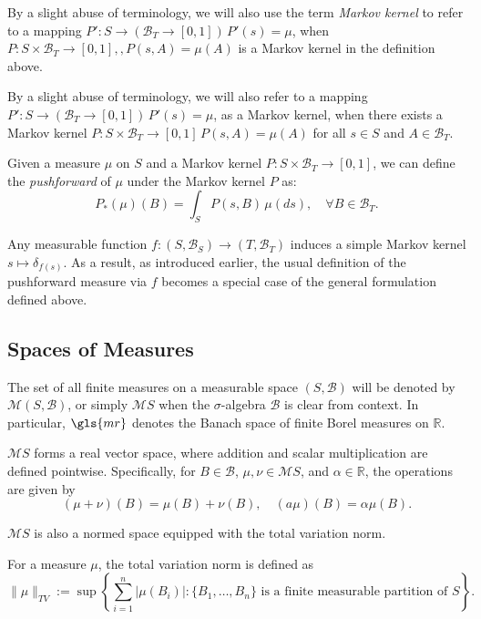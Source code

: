 By a slight abuse of terminology, we will also use the term \emph{Markov kernel} to refer to a mapping  $P': S \to (\mathcal{B}_T \to [0,1]) \, P'(s)=\mu$, when $P : S \times \mathcal{B}_T \to [0,1], , P(s,A)=\mu(A)$ is a Markov kernel in the definition above.

By a slight abuse of terminology, we will also refer to a mapping $ P' : S \to (\mathcal{B}_T \to [0,1])\, P'(s)=\mu $, as a Markov kernel, when there exists a Markov kernel $ P : S \times \mathcal{B}_T \to [0,1] \, P(s,A)=\mu (A) $  for all $s \in S $ and $A \in \mathcal{B}_T$.

\begin{definition}
  Given a measure $\mu$ on $S$ and a Markov kernel $P: S \times \mathcal{B}_T \to [0,1]$, we can define the \emph{pushforward} of $\mu$   under the Markov kernel $P$  as:
$$
P_*(\mu)(B) = \int_S P(s, B) \, \mu(ds), \quad \forall B \in \mathcal{B}_T.
$$
\end{definition}

Any measurable function \( f : (S, \mathcal{B}_S) \to (T, \mathcal{B}_T) \) induces a simple Markov kernel $ s \mapsto \delta_{f(s)} $. As a result, as introduced earlier, the usual definition of the pushforward measure via \( f \) becomes a special case of the general formulation defined above.

\subsection{Spaces of Measures}

The set of all finite measures on a measurable space $(S, \mathcal{B})$ will be denoted by $\mathcal{M}(S, \mathcal{B})$, 
or simply $\mathcal{M}S$ when the $\sigma$-algebra $\mathcal{B}$ is clear from context. In particular, $\gls{mr}$ denotes  the Banach space of finite Borel measures on $\mathbb{R}$.

 $\mathcal{M}S $ forms a real vector space, where addition and scalar multiplication are defined pointwise. Specifically, for  $ B \in \mathcal{B} $, $ \mu, \nu \in \mathcal{M}S $, and $ \alpha \in \mathbb{R} $, the operations are given by
$$
(\mu + \nu)(B) = \mu(B) + \nu(B), \quad (a\mu)(B) = \alpha \mu(B).
$$


\( \mathcal{M}S \) is also a normed space equipped with the total variation norm. 

\begin{definition}
  For a measure \( \mu \), the total variation norm is defined as
$$
\|\mu\|_{TV} := \sup \left\{ \sum_{i=1}^n |\mu(B_i)| : \{B_1, \dots, B_n\} \text{ is a finite measurable partition of } S \right\}.
$$
\end{definition}

